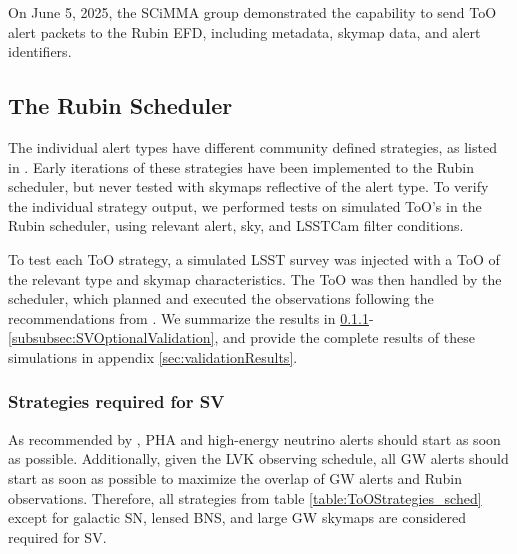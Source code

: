 On June 5, 2025, the SCiMMA group demonstrated the capability to send ToO alert packets to the Rubin EFD, including metadata, skymap data, and alert identifiers.

\subsection{The Rubin Scheduler}\label{subsec:Scheduler verification}

The individual alert types have different community defined strategies, as listed in \cite{RubinToO2024}. Early iterations of these strategies have been implemented to the Rubin scheduler, but never tested with skymaps reflective of the alert type. To verify the individual strategy output, we performed tests on simulated ToO's in the Rubin scheduler, using relevant alert, sky, and LSSTCam filter conditions.

To test each ToO strategy, a simulated LSST survey was injected with a ToO of the relevant type and skymap characteristics. The ToO was then handled by the scheduler, which planned and executed the observations following the recommendations from \cite{RubinToO2024}. We summarize the results in \ref{subsubsec:SVRequiredValidation}-\ref{subsubsec:SVOptionalValidation}, and provide the complete results of these simulations in appendix \ref{sec:validationResults}.

\subsubsection{Strategies required for SV}\label{subsubsec:SVRequiredValidation}

As recommended by \cite{PSTN-056}, PHA and high-energy neutrino alerts should start as soon as possible. Additionally, given the LVK observing schedule, all GW alerts should start as soon as possible to maximize the overlap of GW alerts and Rubin observations. Therefore, all strategies from table \ref{table:ToOStrategies_sched} except for galactic SN, lensed BNS, and large GW skymaps are considered required for SV.

